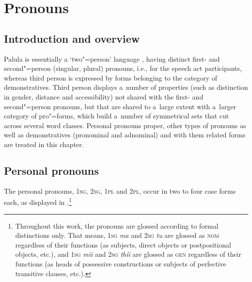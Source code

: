 \chapter{Pronouns}
\label{chap:5}

\section{Introduction and overview}
\label{sec:5-1}


Palula is essentially a `two"=person' language \citep[4--15]{bhat2004}, having distinct first- and second"=person (singular, plural) pronouns, i.e., for the speech act participants, whereas third person is expressed by forms belonging to the category of demonstratives. Third person displays a~number of properties (such as distinction in gender, distance and accessibility) not shared with the first- and second"=person pronouns, but that are shared to a~large extent with a~larger category of pro"=forms, which build a~number of symmetrical sets that cut across several word classes. Personal pronouns proper, other types of pronouns as well as demonstratives (pronominal and adnominal) and with them related forms are treated in this chapter.


\section{Personal pronouns}
\label{sec:5-2}

The personal pronouns, \textsc{1sg}, \textsc{2sg}, \textsc{1pl} and \textsc{2pl}, occur in two to four case forms each, as displayed in .\footnote{Throughout this work, the pronouns are glossed according to formal distinctions only. That means, \textsc{1sg} \textit{ma} and \textsc{2sg} \textit{tu} are glossed as \textsc{nom} regardless of their functions (as subjects, direct objects or postpositional objects, etc.), and \textsc{1sg} \textit{míi} and \textsc{2sg} \textit{thíi} are glossed as \textsc{gen} regardless of their functions (as heads of possessive constructions or subjects of perfective transitive clauses, etc.).} 

